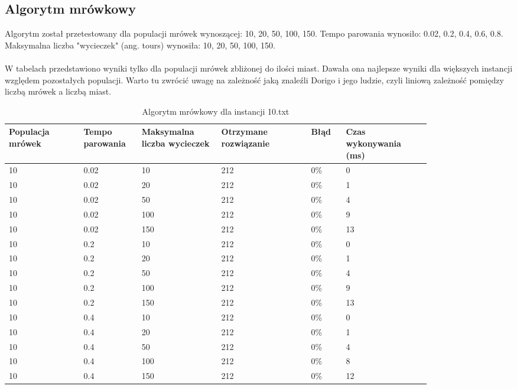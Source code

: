 \documentclass[12pt,a4paper,titlepage]{article}
\begin{document}
\subsection{Algorytm mrówkowy}
Algorytm został przetestowany dla populacji mrówek wynoszącej: 10, 20, 50, 100, 150. Tempo parowania wynosiło: 0.02, 0.2, 0.4, 0.6, 0.8. Maksymalna liczba "wycieczek" (ang. tours) wynosiła: 10, 20, 50, 100, 150.
\\\\
W tabelach przedstawiono wyniki tylko dla populacji mrówek zbliżonej do ilości miast. Dawała ona najlepsze wyniki dla większych instancji względem pozostałych populacji. Warto tu zwrócić uwagę na zależność jaką znaleźli Dorigo i jego ludzie, czyli liniową zależność pomiędzy liczbą mrówek a liczbą miast.

\begin{table}[H]
	\caption{Algorytm mrówkowy dla instancji 10.txt}
    \centering
	\begin{tabular}{|p{0.15\linewidth}|p{0.10\linewidth}|p{0.16\linewidth}|p{0.18\linewidth}|p{0.07\linewidth}|p{0.17\linewidth}|}
		\hline
        Populacja mrówek & Tempo parowania & Maksymalna liczba \newline wycieczek & Otrzymane rozwiązanie & Błąd & Czas \newline wykonywania (ms) \\
		\hline
		10 & 0.02 & 10 & 212 & 0\% & 0 \\
        10 & 0.02 & 20 & 212 & 0\% & 1 \\
        10 & 0.02 & 50 & 212 & 0\% & 4 \\
        10 & 0.02 & 100 & 212 & 0\% & 9 \\
        10 & 0.02 & 150 & 212 & 0\% & 13 \\
        \hline
        10 & 0.2 & 10 & 212 & 0\% & 0 \\
        10 & 0.2 & 20 & 212 & 0\% & 1 \\
        10 & 0.2 & 50 & 212 & 0\% & 4 \\
        10 & 0.2 & 100 & 212 & 0\% & 9 \\
        10 & 0.2 & 150 & 212 & 0\% & 13 \\
        \hline
        10 & 0.4 & 10 & 212 & 0\% & 0 \\
        10 & 0.4 & 20 & 212 & 0\% & 1 \\
        10 & 0.4 & 50 & 212 & 0\% & 4 \\
        10 & 0.4 & 100 & 212 & 0\% & 8 \\
        10 & 0.4 & 150 & 212 & 0\% & 12 \\

\end{tabular}
\end{table}
\end{document}
